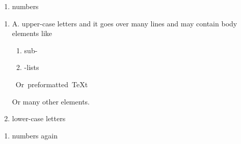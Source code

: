 \documentclass[12pt]{article}
\begin{document}
\begin{enumerate}[label=\arabic*.]
\item
numbers
\end{enumerate}
\begin{enumerate}[label=\alph*.]
\item
A. upper-case letters
and it goes over many lines and may contain body elements like

 \begin{enumerate}[label=\arabic*.]
\item
sub-

\item
-lists
 \end{enumerate}

\begin{ttfamily}\begin{flushleft}
\mbox{~Or~preformatted~\TeX{}t}\\
\end{flushleft}\end{ttfamily}

 Or many other elements.

\item
lower-case letters
\end{enumerate}
\begin{enumerate}[label=\arabic*.]
\item
numbers again
\end{enumerate}
\end{document}

